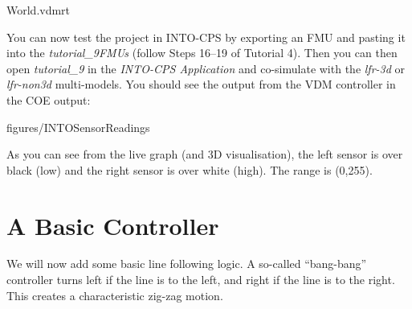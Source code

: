 \documentclass[11pt,a4paper]{../tutorial}
\begin{document}
\begin{instructions}
    \bigskip
    
    {World.vdmrt}

\item You can now test the project in INTO-CPS by exporting an FMU and pasting it into the \emph{tutorial\_9\pathsep{}FMUs} (follow Steps 16--19 of Tutorial 4). Then you can then open \emph{tutorial\_9} in the \emph{INTO-CPS Application} and co-simulate with the \emph{lfr-3d} or \emph{lfr-non3d} multi-models. You should see the output from the VDM controller in the COE output:

    \begin{annotation}[width=0.99\linewidth,trim=0 70 0 0,clip]{figures/INTOSensorReadings}
    \end{annotation}

    As you can see from the live graph (and 3D visualisation), the left sensor is over black (low) and the right sensor is over white (high). The range is (0,255).

\end{instructions}

\newpage
\section{A Basic Controller}

We will now add some basic line following logic. A so-called ``bang-bang'' controller turns left if the line is to the left, and right if the line is to the right. This creates a characteristic zig-zag motion.
\end{document}
